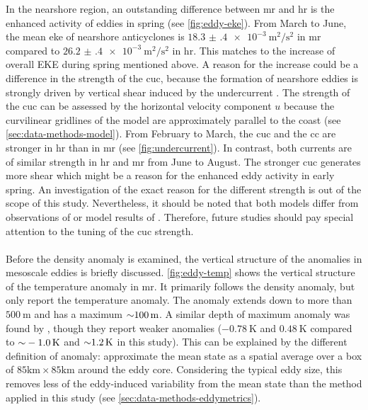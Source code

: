 In the nearshore region, an outstanding difference between \ac{mr} and \ac{hr} is the enhanced activity of eddies in spring (see \autoref{fig:eddy-eke}). From March to June, the mean \ac{eke} of nearshore anticyclones is $\SI[separate-uncertainty]{18.3(4)e-3}{\metre\squared\per\second\squared}$ in \ac{mr} compared to $\SI[separate-uncertainty]{26.2(4)e-3}{\metre\squared\per\second\squared}$ in \ac{hr}. This matches to the increase of overall EKE during spring mentioned above. A reason for the increase could be a difference in the strength of the \ac{cuc}, because the formation of nearshore eddies is strongly driven by vertical shear induced by the undercurrent \autocite{checkley-2009-currentstructure-calcs, kurian-2011-eddy-props}. The strength of the \ac{cuc} can be assessed by the horizontal velocity component $u$ because the curvilinear gridlines of the model are approximately parallel to the coast (see \autoref{sec:data-methods-model}). From February to March, the \ac{cuc} and the \ac{cc} are stronger in \ac{hr} than in \ac{mr} (see \autoref{fig:undercurrent}). In contrast, both currents are of similar strength in \ac{hr} and \ac{mr} from June to August. The stronger \ac{cuc} generates more shear which might be a reason for the enhanced eddy activity in early spring. An investigation of the exact reason for the different strength is out of the scope of this study. Nevertheless, it should be noted that both models differ from observations of \textcite[see their Figure 4.2.3.1 to 4.2.3.4]{rudnick-2017-calcs-climatology} or model results of \textcite[see their Figure 20]{renault-2020-model-descr}. Therefore, future studies should pay special attention to the tuning of the \ac{cuc} strength.\\
\\
Before the density anomaly is examined, the vertical structure of the anomalies in mesoscale eddies is briefly discussed. \autoref{fig:eddy-temp} shows the vertical structure of the temperature anomaly in \ac{mr}. It primarily follows the density anomaly, but \textcite{kurian-2011-eddy-props} only report the temperature anomaly. The anomaly extends down to more than $\SI{500}{\metre}$ and has a maximum ${\sim} \SI{100}{\metre}$. A similar depth of maximum anomaly was found by \textcite[see their Figure 16]{kurian-2011-eddy-props}, though they report weaker anomalies ($\SI{-0.78}{\kelvin}$ and $\SI{0.48}{\kelvin}$ compared to ${\sim}\SI{-1.0}{\kelvin}$ and ${\sim}\SI{1.2}{\kelvin}$ in this study). This can be explained by the different definition of anomaly: \textcite{kurian-2011-eddy-props} approximate the mean state as a spatial average over a box of $85\si{\kilo\metre} \times 85\si{\kilo\metre}$ around the eddy core. Considering the typical eddy size, this removes less of the eddy-induced variability from the mean state than the method applied in this study (see \autoref{sec:data-methods-eddymetrics}).\\
